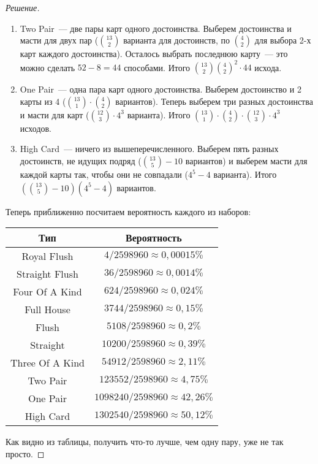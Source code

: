 \begin{proof}[Решение]
\begin{enumerate}
        \item Two Pair~--- две пары карт одного достоинства. Выберем достоинства и масти для двух пар (\(\binom{13}{2}\) варианта для достоинств, по \(\binom{4}{2}\) для выбора 2-х карт каждого достоинства). Осталось выбрать последнюю карту~--- это можно сделать \(52 - 8 = 44\) способами. Итого \(\binom{13}{2} \binom{4}{2}^2 \cdot 44\) исхода.
        \item One Pair~--- одна пара карт одного достоинства. Выберем достоинство и 2 карты из 4 (\(\binom{13}{1} \cdot \binom{4}{2}\) вариантов). Теперь выберем три разных достоинства и масти для карт (\(\binom{12}{3} \cdot 4^3\) варианта). Итого \(\binom{13}{1} \cdot \binom{4}{2} \cdot \binom{12}{3} \cdot 4^3\) исходов.
        \item High Card~--- ничего из вышеперечисленного. Выберем пять разных достоинств, не идущих подряд (\(\binom{13}{5} - 10\) вариантов) и выберем масти для каждой карты так, чтобы они не совпадали (\(4^5 - 4\) варианта). Итого \((\binom{13}{5} - 10)(4^5 - 4)\) вариантов.
    \end{enumerate}
    Теперь приближенно посчитаем вероятность каждого из наборов:
    
    \begin{center}
        \begin{tabular}{|c|c|}
            \hline
            Тип & Вероятность \\
            \hline
            Royal Flush & \(4/2598960 \approx 0,00015\%\) \\
            \hline
            Straight Flush & \(36/2598960 \approx 0,0014\%\) \\
            \hline
            Four Of A Kind & \(624/2598960 \approx 0,024\%\) \\
            \hline
            Full House & \(3744/2598960 \approx 0,15\%\) \\
            \hline
            Flush & \(5108/2598960 \approx 0,2\%\) \\
            \hline
            Straight & \(10200/2598960 \approx 0,39\%\) \\
            \hline
            Three Of A Kind & \(54912/2598960 \approx 2,11\%\) \\
            \hline
            Two Pair & \(123552/2598960 \approx 4,75\%\) \\
            \hline
            One Pair & \(1098240/2598960 \approx 42,26\%\) \\
            \hline
            High Card & \(1302540/2598960 \approx 50,12\%\) \\
            \hline
        \end{tabular}
    \end{center}
    Как видно из таблицы, получить что-то лучше, чем одну пару, уже не так просто.
\end{proof}